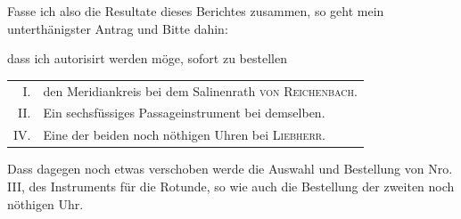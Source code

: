 Fasse ich also die Resultate dieses Berichtes zusammen, so geht mein unterthänigster Antrag und Bitte dahin:\par
\hspace*{\parindent}dass ich autorisirt werden möge, sofort zu bestellen
\begin{center}\begin{tabular}{@{}rp{}@{}}
I.&den Meridiankreis bei dem Salinenrath \textsc{von Reichenbach}.\\
II.&Ein sechsfüssiges Passageinstrument bei demselben.\\
IV.&Eine der beiden noch nöthigen Uhren bei \textsc{Liebherr}.
\end{tabular}\end{center}

Dass dagegen noch etwas verschoben werde die Auswahl und Bestellung von Nro. III, des Instruments für die Rotunde, so wie auch die Bestellung der zweiten noch nöthigen Uhr.

